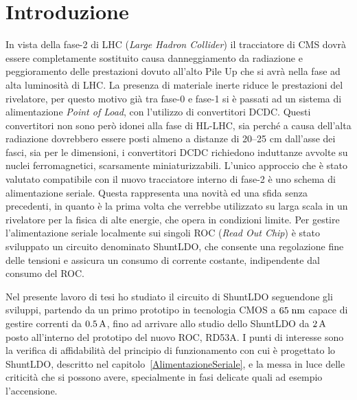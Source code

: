 \chapter{Introduzione}
In vista della fase-2 di LHC (\textit{Large Hadron Collider}) il tracciatore di CMS dovrà essere completamente sostituito causa danneggiamento da radiazione e peggioramento delle prestazioni dovuto all'alto Pile Up che si avrà nella fase ad alta luminosità di LHC.
La presenza di materiale inerte riduce le prestazioni del rivelatore, per questo motivo già tra fase-0 e fase-1 si è passati ad un sistema di alimentazione \textit{Point of Load}, con l'utilizzo di convertitori DCDC. Questi convertitori non sono però idonei alla fase di HL-LHC, sia perché  a causa dell'alta radiazione dovrebbero essere posti almeno a distanze di 20--25 cm dall'asse dei fasci, sia per le dimensioni, i convertitori DCDC richiedono induttanze avvolte su nuclei ferromagnetici, scarsamente miniaturizzabili. 
L'unico approccio che è stato valutato compatibile con il nuovo tracciatore interno di fase-2 è uno schema di alimentazione seriale. 
Questa rappresenta una novità ed una sfida senza precedenti, in quanto è la prima volta che verrebbe utilizzato su larga scala in un rivelatore per la fisica di alte energie, che opera in condizioni limite. 
Per gestire l'alimentazione seriale localmente sui singoli ROC (\textit{Read Out Chip}) è stato sviluppato un circuito denominato ShuntLDO, che consente una regolazione fine delle tensioni e assicura un consumo di corrente costante, indipendente dal consumo del ROC.

Nel presente lavoro di tesi ho studiato il circuito di ShuntLDO seguendone gli sviluppi, partendo da un primo prototipo in tecnologia CMOS a $65 \rm \; nm$ capace di gestire correnti da $0.5\rm \, A$, fino ad arrivare allo studio dello ShuntLDO da $2\rm \, A$  posto all'interno del prototipo del nuovo ROC, RD53A. 
I punti di interesse sono la verifica di affidabilità del principio di funzionamento con cui è progettato lo ShuntLDO, descritto nel capitolo~\ref{AlimentazioneSeriale}, e la messa in luce delle criticità che si possono avere, specialmente in fasi delicate quali ad esempio l'accensione.

